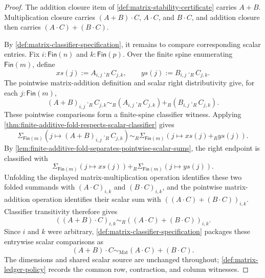\begin{proof}
The addition closure item of \autoref{def:matrix-stability-certificate} carries $A+B$. Multiplication closure carries $(A+B)\cdot C$, $A\cdot C$, and $B\cdot C$, and addition closure then carries $(A\cdot C)+(B\cdot C)$.

By \autoref{def:matrix-classifier-specification}, it remains to compare corresponding scalar entries. Fix $i:\mathsf{Fin}(n)$ and $k:\mathsf{Fin}(p)$. Over the finite spine enumerating $\mathsf{Fin}(m)$, define
$$
xs(j):=A_{i,j}\cdot_RC_{j,k},
\qquad
ys(j):=B_{i,j}\cdot_RC_{j,k}.
$$
The pointwise matrix-addition definition and scalar right distributivity give, for each $j:\mathsf{Fin}(m)$,
$$
(A+B)_{i,j}\cdot_RC_{j,k}
\sim_R
(A_{i,j}\cdot_RC_{j,k})+_R(B_{i,j}\cdot_RC_{j,k}).
$$
These pointwise comparisons form a finite-spine classifier witness. Applying \autoref{thm:finite-additive-fold-respects-scalar-classifier} gives
$$
\Sigma_{\mathsf{Fin}(m)}(j\mapsto (A+B)_{i,j}\cdot_RC_{j,k})
\sim_R
\Sigma_{\mathsf{Fin}(m)}(j\mapsto xs(j)+_Rys(j)).
$$
By \autoref{lem:finite-additive-fold-separates-pointwise-scalar-sums}, the right endpoint is classified with
$$
\Sigma_{\mathsf{Fin}(m)}(j\mapsto xs(j))+_R
\Sigma_{\mathsf{Fin}(m)}(j\mapsto ys(j)).
$$
Unfolding the displayed matrix-multiplication operation identifies these two folded summands with $(A\cdot C)_{i,k}$ and $(B\cdot C)_{i,k}$, and the pointwise matrix-addition operation identifies their scalar sum with $((A\cdot C)+(B\cdot C))_{i,k}$. Classifier transitivity therefore gives
$$
((A+B)\cdot C)_{i,k}\sim_R((A\cdot C)+(B\cdot C))_{i,k}.
$$
Since $i$ and $k$ were arbitrary, \autoref{def:matrix-classifier-specification} packages these entrywise scalar comparisons as
$$
(A+B)\cdot C\sim_{\mathrm{Mat}}(A\cdot C)+(B\cdot C).
$$
The dimensions and shared scalar source are unchanged throughout; \autoref{def:matrix-ledger-policy} records the common row, contraction, and column witnesses.
\end{proof}
